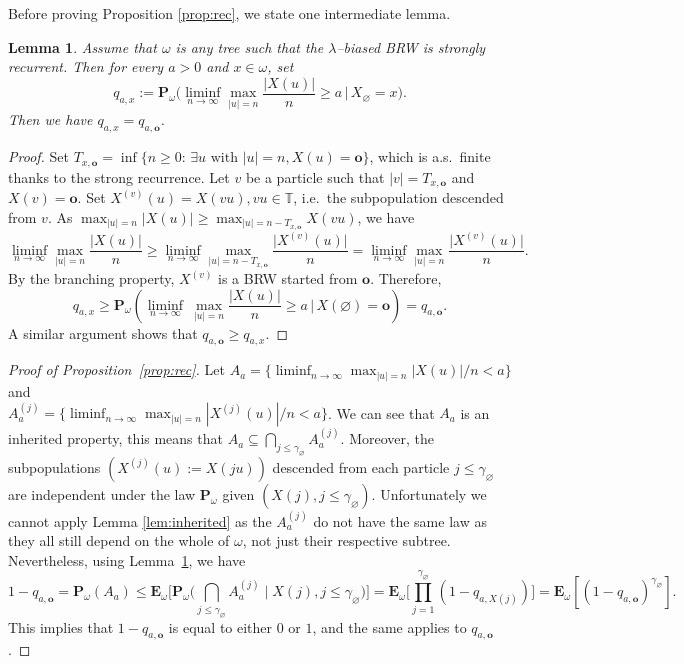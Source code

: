 \documentclass[11 pt]{article}
\newtheorem{lemma}[theorem]{Lemma}
\theoremstyle{definition}
\numberwithin{equation}{section}
\newcommand{\TT}{\mathbb{T}} %
\newcommand{\rt}{\mathbf{o}} %
\newcommand{\Pw}{\mathbf{P}_{\omega}} %
\newcommand{\Ew}{\mathbf{E}_{\omega}} %
\begin{document}
Before proving Proposition \ref{prop:rec}, we state one intermediate lemma. 

 \begin{lemma}\label{lem:rec}
 	Assume that $\omega$ is any tree such that the $\lambda$--biased BRW is strongly recurrent. 
 	Then for every $a>0$ and $x\in \omega$, 
 	set 
 	\[
 	q_{a,x}	:= \Pw \Big(	\liminf_{n\to \infty} \max_{\vert u \vert = n}\frac{\vert X(u) \vert}{n} \ge a \,\Big|\, X_{\varnothing} = x \Big).
 	\]
 	Then we have $q_{a,x} = q_{a,\rt}$. 
 \end{lemma}

 \begin{proof}
 	Set $T_{x,\rt} = \inf\{n\ge 0\colon \, \exists u \text{ with } |u|=n, X(u) =\rt\}$, which is a.s.\ finite thanks to the 	
	strong recurrence. Let $v$ be a particle such that $|v| = T_{x, \rt}$ and $X(v) = \rt$. 
 	Set $X^{(v)}(u) = X(vu), vu\in \TT$, i.e.\ the subpopulation descended from $v$. 
 	As $\max_{\vert u \vert=n}\vert X(u) \vert \geq \max_{|u| = n - T_{x,\rt}} X(vu)$, we have 
 	\[
 		\liminf_{n\to \infty} \max_{\vert u \vert=n} \frac{\vert X(u) \vert }{n}  \ge 	\liminf_{n\to \infty}  \max_{|u| = n - T_{x,\rt}}  \frac{\vert X^{(v)}(u) \vert }{n}
 	= 	\liminf_{n\to \infty} \max_{|u| = n}  \frac{\vert X^{(v)}(u) \vert }{n}.
 	\]
 	By the branching property, $X^{(v)}$ is a BRW started from $\rt$. Therefore, 
 	\[
 		q_{a,x} \ge \Pw \left(	\liminf_{n\to \infty}\ \max_{|u| = n}  \frac{\vert X(u) \vert }{n} \ge a \,\Big|\, X(\varnothing) = \rt \right)
 	= q_{a, \rt}. 
 	\]
 	A similar argument shows that $q_{a,\rt} \ge q_{a,x}$. 
 \end{proof}

\begin{proof}[Proof of Proposition~\ref{prop:rec}]
	Let $A_a = \{	\liminf_{n\to \infty} \max_{|u|=n} |X(u)|/n < a\}$ and \\
 	$A_{a}^{(j)} = \{	\liminf_{n\to \infty} \max_{|u|=n} |X^{(j)}(u)|/n < a\}$. We can see that $A_{a}$ is an inherited property, this means that
 	$A_{a}  \subseteq \bigcap_{j\le \gamma_{\varnothing}} A_{a}^{(j)}$. Moreover, the
	subpopulations $(X^{(j)}(u) := X(ju))$ descended from each particle $j \le \gamma_{\varnothing}$ are independent under 
	the law $\Pw$ given $(X(j), j\le \gamma_{\varnothing})$. Unfortunately we cannot apply Lemma \ref{lem:inherited}
	as the $A_a^{(j)}$ do not have the same law as they all still depend on the whole of $\omega$, not just their
	respective subtree. Nevertheless, using Lemma~\ref{lem:rec}, we have
	\begin{equation*}
		1- q_{a, \rt} = \Pw(A_a) \le \Ew\bigg[\Pw \bigg(\bigcap_{j\le \gamma_{\varnothing}} A_{a}^{(j)} \;\bigg|\; X(j), j\le \gamma_{\varnothing} \bigg) \bigg]
 	 	= \Ew\bigg[ \prod_{j=1}^{\gamma_{\varnothing}}\left( 1- q_{a,X(j)} \right)\bigg]
 	 	 = \Ew[\left(1- q_{a, \rt}\right)^{\gamma_{\varnothing}}]. 
	\end{equation*}
 	 This implies that $1-q_{a, \rt}$ is equal to either $0$ or $1$, and the same applies to  $q_{a, \rt}$.
\end{proof}
\end{document}
